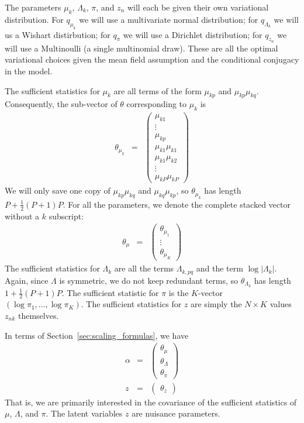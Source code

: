 \documentclass{article}\usepackage[]{graphicx}\usepackage[]{color}
\newcommand{\mysec}[1]{Section~\ref{sec:#1}}
\begin{document}
The parameters $\mu_{k}$, $\Lambda_{k}$, $\pi$, and $z_{n}$ will
each be given their own variational distribution.  For $q_{\mu_k}$ we will
use a multivariate normal distribution; for $q_{\Lambda_{k}}$ we will
us a Wishart distirbution; for $q_{\pi}$ we will use a Dirichlet distribution;
for $q_{z_{n}}$ we will use a Multinoulli (a single multinomial draw).  These
are all the optimal variational choices given the mean field assumption and
the conditional conjugacy in the model.

The sufficient statistics for $\mu_{k}$ are all terms of the form
$\mu_{kp}$ and $\mu_{kp}\mu_{kq}$. Consequently, the sub-vector
of $\theta$ corresponding to $\mu_{k}$ is
%
\begin{eqnarray*}
\theta_{\mu_{k}} & = & \left(\begin{array}{c}
\mu_{k1}\\
\vdots\\
\mu_{kp}\\
\mu_{k1}\mu_{k1}\\
\mu_{k1}\mu_{k2}\\
\vdots\\
\mu_{kP}\mu_{kP}
\end{array}\right)
\end{eqnarray*}
%
We will only save one copy of $\mu_{kp}\mu_{kq}$ and $\mu_{kq}\mu_{kp}$,
so $\theta_{\mu_{k}}$ has length $P+\frac{1}{2}\left(P+1\right)P$.
For all the parameters, we denote the complete stacked vector without
a $k$ subscript:
%
\begin{eqnarray*}
\theta_{\mu} & = & \left(\begin{array}{c}
\theta_{\mu_{1}}\\
\vdots\\
\theta_{\mu_{K}}
\end{array}\right)
\end{eqnarray*}
%
The sufficient statistics for $\Lambda_{k}$ are all the terms $\Lambda_{k,pq}$
and the term $\log\left|\Lambda_{k}\right|$. Again, since $\Lambda$ is
symmetric, we do not keep redundant terms, so $\theta_{\Lambda_{k}}$ has length
$1+\frac{1}{2}\left(P+1\right)P$. The sufficient statistic for $\pi$ is the
$K$-vector $\left(\log\pi_{1},...,\log\pi_{K}\right)$. The sufficient statistics
for $z$ are simply the $N\times K$ values $z_{nk}$ themselves.

In terms of \mysec{scaling_formulas}, we have
%
\begin{eqnarray*}
\alpha & = & \left(\begin{array}{c}
\theta_{\mu}\\
\theta_{\Lambda}\\
\theta_{\pi}
\end{array}\right)\\
z & = & \left(\begin{array}{c}
\theta_{z}\end{array}\right)
\end{eqnarray*}
%
That is, we are primarily interested in the covariance of the sufficient
statistics of $\mu$, $\Lambda$, and $\pi$.  The latent variables $z$ are
nuisance parameters.
\end{document}
